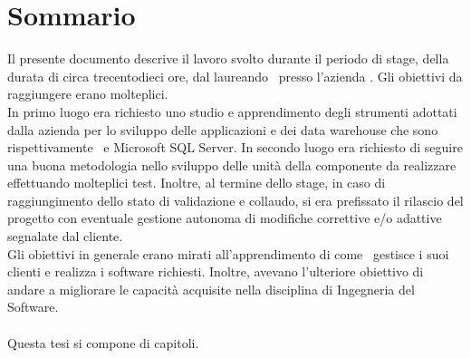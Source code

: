 
\cleardoublepage
{}
{}
\begingroup
\let\clearpage\relax
\let\cleardoublepage\relax
\let\cleardoublepage\relax

\chapter*{Sommario}

Il presente documento descrive il lavoro svolto durante il periodo di stage, della durata di circa trecentodieci ore, dal laureando \myName\ presso l'azienda \azienda .
Gli obiettivi da raggiungere erano molteplici.\\
In primo luogo era richiesto uno studio e apprendimento degli strumenti adottati dalla azienda per lo sviluppo delle applicazioni e dei data warehouse che sono rispettivamente \inde\ e  Microsoft SQL Server. In secondo luogo era richiesto di seguire una buona metodologia nello sviluppo delle unità della componente da realizzare effettuando molteplici test. Inoltre, al termine dello stage, in caso di raggiungimento dello stato di validazione e collaudo, si era prefissato il rilascio del progetto con eventuale gestione autonoma di modifiche correttive e/o adattive segnalate dal cliente.\\
Gli obiettivi in generale erano mirati all'apprendimento di come \azienda\ gestisce i suoi clienti e realizza i software richiesti. Inoltre, avevano l'ulteriore obiettivo di andare a migliorare le capacità acquisite nella disciplina di Ingegneria del Software.\\
\\
Questa tesi si compone di \todo capitoli.



